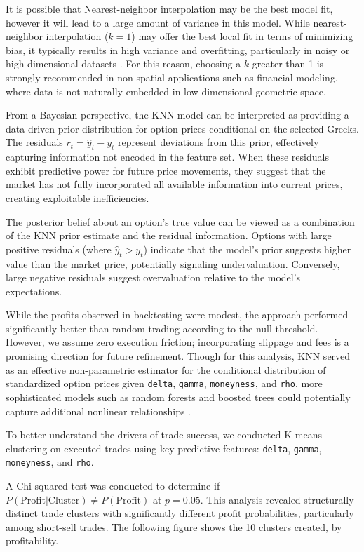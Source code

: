 \documentclass{article}
\begin{document}
It is possible that Nearest-neighbor interpolation may be the best model fit, however it will lead to a large amount of variance in this model. While nearest-neighbor interpolation (\( k = 1 \)) may offer the best local fit in terms of minimizing bias, it typically results in high variance and overfitting, particularly in noisy or high-dimensional datasets \cite{caruana2006empirical}. For this reason, choosing a $k$ greater than 1 is strongly recommended in non-spatial applications such as financial modeling, where data is not naturally embedded in low-dimensional geometric space.

From a Bayesian perspective, the KNN model can be interpreted as providing a data-driven prior distribution for option prices conditional on the selected Greeks. The residuals $r_t = \hat{y}_t - y_t$ represent deviations from this prior, effectively capturing information not encoded in the feature set. When these residuals exhibit predictive power for future price movements, they suggest that the market has not fully incorporated all available information into current prices, creating exploitable inefficiencies.

The posterior belief about an option's true value can be viewed as a combination of the KNN prior estimate and the residual information. Options with large positive residuals (where $\hat{y}_t > y_t$) indicate that the model's prior suggests higher value than the market price, potentially signaling undervaluation. Conversely, large negative residuals suggest overvaluation relative to the model's expectations.

While the profits observed in backtesting were modest, the approach performed significantly better than random trading according to the null threshold. However, we assume zero execution friction; incorporating slippage and fees is a promising direction for future refinement. Though for this analysis, KNN served as an effective non-parametric estimator for the conditional distribution of standardized option prices given \verb|delta|, \verb|gamma|, \verb|moneyness|, and \verb|rho|, more sophisticated models such as random forests and boosted trees could potentially capture additional nonlinear relationships \cite{caruana2006empirical}.

To better understand the drivers of trade success, we conducted K-means clustering on executed trades using key predictive features: \verb|delta|, \verb|gamma|, \verb|moneyness|, and \verb|rho|. 

A Chi-squared test was conducted to determine if $P(\text{Profit} | \text{Cluster}) \neq P(\text{Profit})$ at $p=0.05$. This analysis revealed structurally distinct trade clusters with significantly different profit probabilities, particularly among short-sell trades. The following figure shows the 10 clusters created, by profitability.
\end{document}
